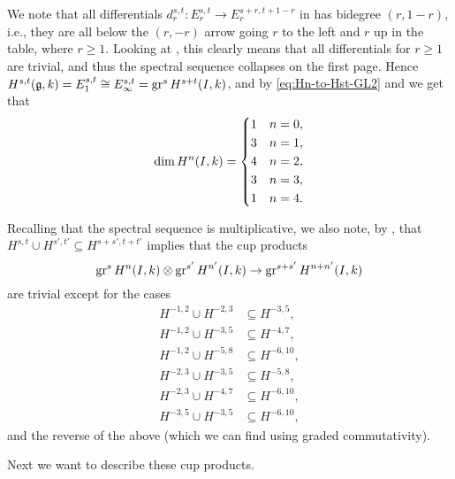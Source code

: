We note that all differentials $d_{r}^{s,t} \colon E_{r}^{s,t} \to E_{r}^{s+r,t+1-r}$ in  has bidegree $(r,1-r)$, i.e., they are all below the $(r,-r)$ arrow going $r$ to the left and $r$ up in the table, where $r \geq 1$. Looking at , this clearly means that all differentials for $r \geq 1$ are trivial, and thus the spectral sequence collapses on the first page. Hence $H^{s,t}(\mathfrak{g},k) = E_{1}^{s,t} \cong E_{\infty}^{s,t} = \operatorname{gr}^{s} H^{s+t}(I,k)$, and by \eqref{eq:Hn-to-Hst-GL2} and  we get that
\begin{equation}
  \label{eq:dim-HnI-GL2}
  \dim H^{n}(I,k) =
  \begin{dcases}
    1 & n=0, \\
    3 & n=1, \\
    4 & n=2, \\
    3 & n=3, \\
    1 & n=4.
  \end{dcases}
\end{equation}

Recalling that the spectral sequence is multiplicative, we also note, by , that $H^{s,t} \cup H^{s',t'} \subseteq H^{s+s',t+t'}$ implies that the cup products
\begin{equation*}
  \operatorname{gr}^{s} H^{n}(I,k) \otimes \operatorname{gr}^{s'} H^{n'}(I,k) \to \operatorname{gr}^{s+s'} H^{n+n'}(I,k)
\end{equation*}
are trivial except for the cases
\begin{equation}\label{eq:non-triv-cups-GL2}
  \begin{aligned}
    H^{-1,2} \cup H^{-2,3} &\subseteq H^{-3,5}, \\
    H^{-1,2} \cup H^{-3,5} &\subseteq H^{-4,7}, \\
    H^{-1,2} \cup H^{-5,8} &\subseteq H^{-6,10}, \\
    H^{-2,3} \cup H^{-3,5} &\subseteq H^{-5,8}, \\
    H^{-2,3} \cup H^{-4,7} &\subseteq H^{-6,10}, \\
    H^{-3,5} \cup H^{-3,5} &\subseteq H^{-6,10},
  \end{aligned}
\end{equation}
and the reverse of the above (which we can find using graded commutativity).

Next we want to describe these cup products.

